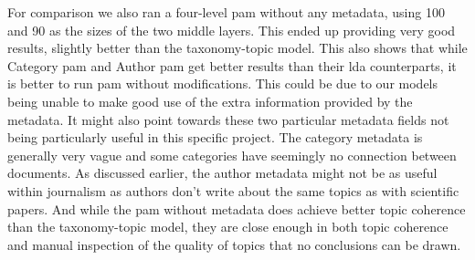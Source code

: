 For comparison we also ran a four-level \gls{pam} without any metadata, using 100 and 90 as the sizes of the two middle layers.
This ended up providing very good results, slightly better than the taxonomy-topic model.
This also shows that while Category \gls{pam} and Author \gls{pam} get better results than their \gls{lda} counterparts, it is better to run \gls{pam} without modifications.
This could be due to our models being unable to make good use of the extra information provided by the metadata.
It might also point towards these two particular metadata fields not being particularly useful in this specific project.
The category metadata is generally very vague and some categories have seemingly no connection between documents.
As discussed earlier, the author metadata might not be as useful within journalism as authors don't write about the same topics as with scientific papers.
And while the \gls{pam} without metadata does achieve better topic coherence than the taxonomy-topic model, they are close enough in both topic coherence and manual inspection of the quality of topics that no conclusions can be drawn.

